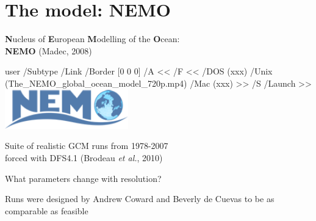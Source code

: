 \documentclass{beamer}
\newcommand{\LaunchBinary}[2]{%
  \leavevmode%
  \pdfstartlink user {
    /Subtype /Link
    /Border [0 0 0]%
    /A <<
      /F <<
         /DOS (xxx)
         /Unix (#1)
         /Mac (xxx)
      >>
      /S /Launch
    >>
  }#2%
  \pdfendlink%
}
\begin{document}
\section{The model: NEMO}

\begin{frame}{\textbf{N}ucleus of \textbf{E}uropean \textbf{M}odelling of the \textbf{O}cean:\\\textbf{NEMO} (Madec, 2008)}

\begin{center}
\LaunchBinary{The_NEMO_global_ocean_model_720p.mp4}{\includegraphics[width=0.4\textwidth]{Logo_NEMO.png}}%
\end{center}
\vspace{0.5cm}
\begin{alertblock}{}
    \centering Suite of realistic GCM runs from 1978-2007\\forced with DFS4.1 (Brodeau \textit{et al.}, 2010) 
\end{alertblock}
\end{frame}

\begin{frame}{What parameters change with resolution?}

\begin{table}
\end{table}
\begin{alertblock}{}
    \centering Runs were designed by Andrew Coward and Beverly de Cuevas to be as comparable as feasible 
\end{alertblock}
\end{frame}
\end{document}
